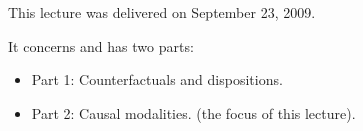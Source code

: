This lecture was delivered on September 23, 2009.

It concerns \cite{sellars1958counterfactuals} and has two parts:
\begin{itemize}
\item Part 1: Counterfactuals and dispositions.
\item Part 2: Causal modalities. (the focus of this lecture).
\end{itemize}

